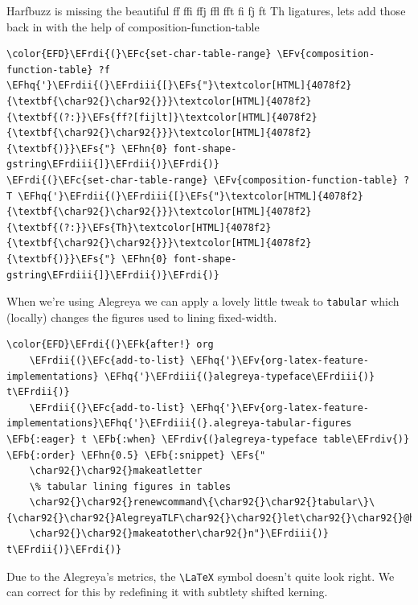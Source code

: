 \documentclass{scrartcl}
\newcommand{\EFk}[1]{\textcolor{EFk}{#1}} %
\newcommand{\EFs}[1]{\textcolor{EFs}{#1}} %
\newcommand{\EFb}[1]{\textcolor{EFb}{#1}} %
\newcommand{\EFc}[1]{\textcolor{EFc}{#1}} %
\newcommand{\EFv}[1]{\textcolor{EFv}{#1}} %
\newcommand{\EFhn}[1]{\textcolor{EFhn}{\textbf{#1}}} %
\newcommand{\EFhq}[1]{\textcolor{EFhq}{#1}} %
\newcommand{\EFrdi}[1]{\textcolor{EFrdi}{#1}} %
\newcommand{\EFrdii}[1]{\textcolor{EFrdii}{#1}} %
\newcommand{\EFrdiii}[1]{\textcolor{EFrdiii}{#1}} %
\newcommand{\EFrdiv}[1]{\textcolor{EFrdiv}{#1}} %
\begin{document}
Harfbuzz is missing the beautiful ff ffi ffj ffl fft fi fj ft Th ligatures,
lets add those back in with the help of composition-function-table

\begin{Code}
\begin{Verbatim}[]
\color{EFD}\EFrdi{(}\EFc{set-char-table-range} \EFv{composition-function-table} ?f \EFhq{'}\EFrdii{(}\EFrdiii{[}\EFs{"}\textcolor[HTML]{4078f2}{\textbf{\char92{}\char92{}}}\textcolor[HTML]{4078f2}{\textbf{(?:}}\EFs{ff?[fijlt]}\textcolor[HTML]{4078f2}{\textbf{\char92{}\char92{}}}\textcolor[HTML]{4078f2}{\textbf{)}}\EFs{"} \EFhn{0} font-shape-gstring\EFrdiii{]}\EFrdii{)}\EFrdi{)}
\EFrdi{(}\EFc{set-char-table-range} \EFv{composition-function-table} ?T \EFhq{'}\EFrdii{(}\EFrdiii{[}\EFs{"}\textcolor[HTML]{4078f2}{\textbf{\char92{}\char92{}}}\textcolor[HTML]{4078f2}{\textbf{(?:}}\EFs{Th}\textcolor[HTML]{4078f2}{\textbf{\char92{}\char92{}}}\textcolor[HTML]{4078f2}{\textbf{)}}\EFs{"} \EFhn{0} font-shape-gstring\EFrdiii{]}\EFrdii{)}\EFrdi{)}
\end{Verbatim}
\end{Code}

When we're using Alegreya we can apply a lovely little tweak to \texttt{tabular} which
(locally) changes the figures used to lining fixed-width.

\begin{Code}
\begin{Verbatim}[]
\color{EFD}\EFrdi{(}\EFk{after!} org
	\EFrdii{(}\EFc{add-to-list} \EFhq{'}\EFv{org-latex-feature-implementations} \EFhq{'}\EFrdiii{(}alegreya-typeface\EFrdiii{)} t\EFrdii{)}
	\EFrdii{(}\EFc{add-to-list} \EFhq{'}\EFv{org-latex-feature-implementations}\EFhq{'}\EFrdiii{(}.alegreya-tabular-figures \EFb{:eager} t \EFb{:when} \EFrdiv{(}alegreya-typeface table\EFrdiv{)} \EFb{:order} \EFhn{0.5} \EFb{:snippet} \EFs{"
	\char92{}\char92{}makeatletter
	\% tabular lining figures in tables
	\char92{}\char92{}renewcommand\{\char92{}\char92{}tabular\}\{\char92{}\char92{}AlegreyaTLF\char92{}\char92{}let\char92{}\char92{}@halignto\char92{}\char92{}@empty\char92{}\char92{}@tabular\}
	\char92{}\char92{}makeatother\char92{}n"}\EFrdiii{)} t\EFrdii{)}\EFrdi{)}
\end{Verbatim}
\end{Code}

Due to the Alegreya's metrics, the \texttt{\textbackslash{}LaTeX} symbol doesn't quite look right. We
can correct for this by redefining it with subtlety shifted kerning.
\end{document}
